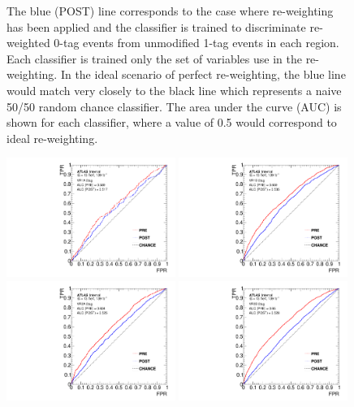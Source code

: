 \begin{figure}[htbp!]
{    The blue (POST) line corresponds to the case where re-weighting has been applied and the classifier is trained to discriminate re-weighted 0-tag events from unmodified 1-tag events in each region.
    Each classifier is trained only the set of variables use in the re-weighting.
    In the ideal scenario of perfect re-weighting, the blue line would match very closely to the black line which represents a naive 50/50 random chance classifier.
    The area under the curve (AUC) is shown for each classifier, where a value of 0.5 would correspond to ideal re-weighting.}
\label{fig:bdt_roc_curves_1tag}
\end{figure}

\begin{figure}[htbp!]
\begin{center}
\includegraphics[width=0.49\textwidth]{BDT/VHqqbbBDTRocCurve_VR1A_2tag.pdf}
\includegraphics[width=0.49\textwidth]{BDT/VHqqbbBDTRocCurve_VR1B_2tag.pdf} \\
\includegraphics[width=0.49\textwidth]{BDT/VHqqbbBDTRocCurve_VR2A_2tag.pdf}
\includegraphics[width=0.49\textwidth]{BDT/VHqqbbBDTRocCurve_VR2B_2tag.pdf}

\end{center}
\end{figure}
